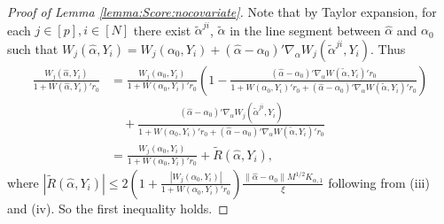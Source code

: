 \documentclass[11pt]{article}
\begin{document}
\begin{proof}[Proof of Lemma \ref{lemma:Score:nocovariate}]
Note that by Taylor expansion, for each $j\in [p], i\in[N]$ there exist $\tilde \alpha^{ji}$, $\tilde{\alpha}$ in the line segment between $\hat \alpha$ and $\alpha_0$ such that
$W_j(\hat\alpha,Y_i) = W_j(\alpha_0,Y_i) + (\hat\alpha-\alpha_0)'\nabla_\alpha W_j(\tilde \alpha^{ji},Y_i)$. Thus 
$$\begin{array}{rl}
\displaystyle\frac{W_j(\hat\alpha,Y_i)}{1+W(\hat\alpha,Y_i)'r_0}&\displaystyle= \frac{W_j(\alpha_0,Y_i) }{1+W(\alpha_0,Y_i)'r_0} \left( 1 -  \frac{(\hat\alpha-\alpha_0)'\nabla_\alpha W(\tilde \alpha,Y_i)'r_0}{1+W(\alpha_0,Y_i)'r_0 + (\hat\alpha-\alpha_0)'\nabla_\alpha W(\tilde \alpha,Y_i)'r_0}\right)\\
&\displaystyle\quad + \frac{(\hat\alpha-\alpha_0)'\nabla_\alpha W_j(\tilde \alpha^{ji},Y_i)}{1+W(\alpha_0,Y_i)'r_0 + (\hat\alpha-\alpha_0)'\nabla_\alpha W(\tilde \alpha,Y_i)'r_0}\\
&\displaystyle = \frac{W_j(\alpha_0,Y_i) }{1+W(\alpha_0,Y_i)'r_0} + \widetilde R(\hat\alpha,Y_i),
\end{array}$$ 
where $\displaystyle|\widetilde R(\hat\alpha,Y_i)| \leq 2\left(1+\frac{|W_j(\alpha_0,Y_i)|}{1+W(\alpha_0,Y_i)'r_0}\right) \frac{\|\hat\alpha-\alpha_0\| M^{1/2}K_{\alpha,1}}{\xi}$ following from (iii) and (iv). So the first inequality holds.


\end{proof}
\end{document}
